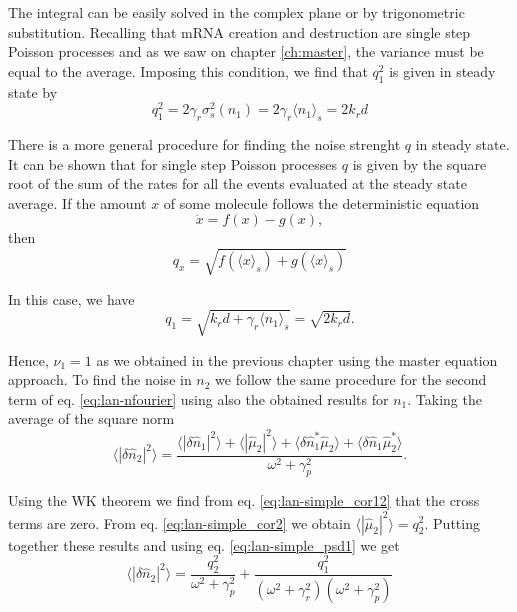 The integral can be easily solved in the complex plane or by trigonometric substitution. Recalling that mRNA creation and destruction are single step Poisson processes and as we saw on chapter \ref{ch:master}, the variance must be equal to the average. Imposing this condition, we find that $q_1^2$ is given in steady state by
\begin{equation*}
  q_1^2 = 2\gamma_r\sigma_s^2(n_1) = 2\gamma_r\langle n_1\rangle_s = 2k_rd
\end{equation*}

There is a more general procedure for finding the noise strenght $q$ in steady state. It can be shown that for single step Poisson processes $q$ is given by the square root of the sum of the rates for all the events evaluated at the steady state average. If the amount $x$ of some molecule follows the deterministic equation
\begin{equation*}
  \dot{x} = f(x) - g(x),
\end{equation*}
then
\begin{equation}
  \label{eq:lan-q_form}
  q_x = \sqrt{f(\langle x\rangle_s)+g(\langle x\rangle_s)}
\end{equation}

In this case, we have
\begin{equation*}
  q_1 = \sqrt{k_rd + \gamma_r\langle n_1\rangle_s} = \sqrt{2k_rd}.
\end{equation*}

Hence, $\nu_1 = 1$ as we obtained in the previous chapter using the master equation approach. To find the noise in $n_2$ we follow the same procedure for the second term of eq. \eqref{eq:lan-nfourier} using also the obtained results for $n_1$. Taking the average of the square norm
\begin{equation*}
  \langle|\delta\hat{n}_2|^2\rangle = \frac{\langle|\delta\hat{n}_1|^2\rangle + \langle|\hat{\mu}_2|^2\rangle + \langle \delta\hat{n}_1^* \hat{\mu}_2\rangle +\langle \delta\hat{n}_1 \hat{\mu}_2^*\rangle}{\omega^2+\gamma_p^2}.
\end{equation*}
  
Using the WK theorem we find from eq. \eqref{eq:lan-simple_cor12} that the cross terms are zero. From eq. \eqref{eq:lan-simple_cor2} we obtain $\langle|\hat{\mu}_2|^2\rangle = q_2^2$. Putting together these results and using eq. \eqref{eq:lan-simple_psd1} we get
\begin{equation*}
  \langle|\delta\hat{n}_2|^2\rangle = \frac{q_2^2}{\omega^2+\gamma_p^2}+\frac{q_1^2}{(\omega^2+\gamma_r^2)(\omega^2+\gamma_p^2)}
\end{equation*}

